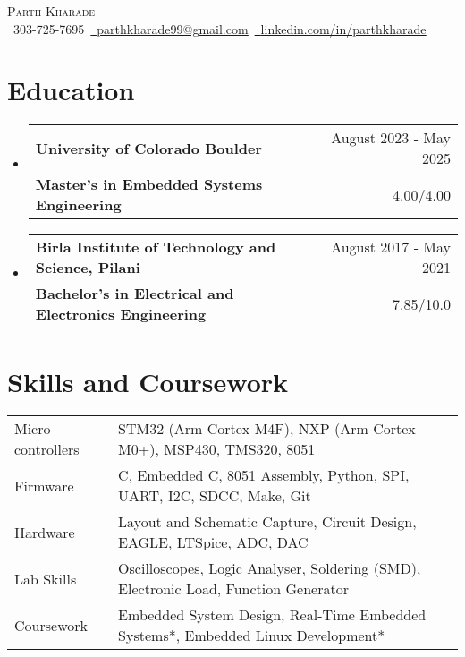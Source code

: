 \documentclass[11pt]{article}
\makeatletter
\newcommand{\resumeSubheading}[4]{
  \vspace{-2pt}\item
    \begin{tabular*}{1.0\textwidth}[t]{l@{\extracolsep{\fill}}r}
       {\large \textbf{#1}}&{\large #2} \\
      \textbf{#3}&{ #4} \\
    \end{tabular*}\vspace{-1pt}
}
\newcommand{\resumeSubHeadingListStart}{\begin{itemize}[leftmargin=0.0in, label={}]}
\newcommand{\resumeSubHeadingListEnd}{\end{itemize}}
\makeatother
\begin{document}
\setlength{\footskip}{4.1pt}
\begin{center}
    {\Huge \scshape Parth Kharade} \\ \vspace{1pt}
    \small \raisebox{-0.1\height}\faPhone\ 303-725-7695{\hspace{0.1cm}}~\href{mailto:parthkharade99@gmail.com}{\raisebox{-0.2\height}\faEnvelope\ \underline{parthkharade99@gmail.com}}~{\hspace{0.1cm}}\href{https://www.linkedin.com/in/parth-k-081287184/}{\raisebox{-0.2\height}\faLinkedin\ \underline{linkedin.com/in/parthkharade}}
    \vspace{-10pt}
\end{center}


\section {Education}
  \resumeSubHeadingListStart
    \resumeSubheading
      {University of Colorado Boulder}{August 2023 - May 2025}
      {Master's in Embedded Systems Engineering}{4.00/4.00}
      \vspace{-0.1in}
    \resumeSubheading
      {Birla Institute of Technology and Science, Pilani}{August 2017 - May 2021}
      {Bachelor's in Electrical and Electronics Engineering}{7.85/10.0}
  \resumeSubHeadingListEnd
 \vspace{-16pt}
 \section{Skills and Coursework}
 \vspace{-4mm}
\begin{table}[!htb]
    \begin{tabular} { m{3.1cm} | m{16cm} } 
      {Micro-controllers}&{\: STM32 (Arm Cortex-M4F), NXP (Arm Cortex-M0+), MSP430, TMS320, 8051} \\
      {Firmware}&{\: C, Embedded C, 8051 Assembly, Python, SPI, UART, I2C, SDCC, Make, Git} \\
      {Hardware}&{\: Layout and Schematic Capture, Circuit Design, EAGLE, LTSpice, ADC, DAC} \\
      {Lab Skills}&{\: Oscilloscopes, Logic Analyser, Soldering (SMD), Electronic Load, Function Generator} \\
      {Coursework}&{\: Embedded System Design, Real-Time Embedded Systems*, Embedded Linux Development*} \\
    \end{tabular}
\end{table}
 \vspace{-16pt}
\end{document}
